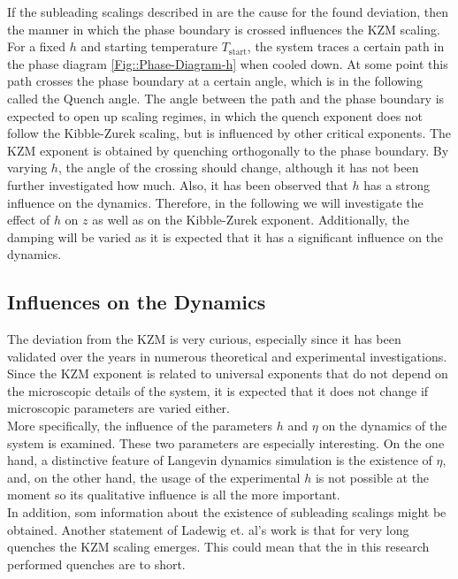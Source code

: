 	If the subleading scalings described in \cite{ladewig2020kibble} are the cause for the found deviation, then the manner in which the phase boundary is crossed influences the KZM	scaling. For a fixed $h$ and starting temperature $T_{\text{start}}$, the system traces a certain path in the phase diagram \autoref{Fig::Phase-Diagram-h} when cooled down. At some point this path crosses the phase boundary at a certain angle, which is in the following called the Quench angle. The angle between the path and the phase boundary is expected to open up scaling regimes, in which the quench exponent does not follow the Kibble-Zurek scaling, but is influenced by other critical exponents. The KZM exponent is obtained by quenching orthogonally to the phase boundary. By varying $h$, the angle of the crossing should change, although it has not been further investigated how much. Also, it has been observed that $h$ has a strong influence on the dynamics. Therefore, in the following we will investigate the effect of $h$ on $z$ as well as on the Kibble-Zurek exponent. Additionally, the damping will be varied as it is expected that it has a significant influence on the dynamics.
	\subsection{Influences on the Dynamics}
	The deviation from the KZM is very curious, especially since it has been validated over the years in numerous theoretical and experimental investigations. Since the KZM exponent is related to universal exponents that do not depend on the microscopic details of the system, it is expected that it does not change if microscopic parameters are varied either. \\
	
	More specifically, the influence of the parameters $h$ and $\eta$ on the dynamics of the system is examined. These two parameters are especially interesting. On the one hand, a distinctive feature of Langevin dynamics simulation is the existence of $\eta$, and, on the other hand, the usage of the experimental $h$ is not possible at the moment so its qualitative influence is all the more important. \\
	
	In addition, som information about the existence of subleading scalings \cite{ladewig2020kibble} might be obtained. Another statement of Ladewig et. al's work \cite{ladewig2020kibble} is that for very long quenches the KZM scaling emerges. This could mean that the in this research performed quenches are to short. \\
	

